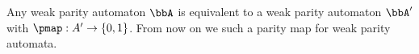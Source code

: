 \begin{remark}
Any weak parity automaton $\bbA$ is equivalent to a weak parity automaton
$\bbA'$ with $\pmap: A' \to \{0,1\}$. From now on we such a parity map for weak parity automata.
\end{remark}




%
%
%
%

